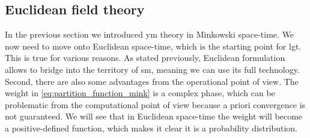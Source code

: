 \subsection{Euclidean field theory}
\label{sub:euclidean_field_theory}

In the previous section we introduced \ac{ym} theory in Minkowski space-time.
We now need to move onto Euclidean space-time, which is the starting point for \ac{lgt}.
This is true for various reasons.
As stated previously, Euclidean formulation allows to bridge into the territory of \ac{sm}, meaning we can use its full technology.
Second, there are also some advantages from the operational point of view.
The weight in \eqref{eq:partition_function_mink} is a complex phase, which can be problematic from the computational point of view because a priori convergence is not guaranteed.
We will see that in Euclidean space-time the weight will become a positive-defined function, which makes it clear it is a probability distribution.

